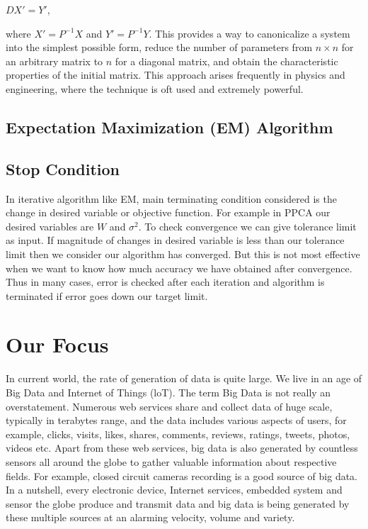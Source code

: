 \documentclass[12pt,notitlepage,oneside]{report}
\begin{document}
$DX' = Y'$,

where $X'=P^{-1}X$ and $Y'=P^{-1}Y$. This provides a way to canonicalize a system into the simplest possible form, reduce the number of parameters from $n \times n$ for an arbitrary matrix to $n$ for a diagonal matrix, and obtain the characteristic properties of the initial matrix. This approach arises frequently in physics and engineering, where the technique is oft used and extremely powerful.



\section{Expectation Maximization (EM) Algorithm}

\section{Stop Condition}

In iterative algorithm like EM, main terminating condition considered is the change in desired variable or objective function. For example in PPCA our desired variables are $W$ and $ \sigma ^2$. To check convergence we can give tolerance limit as input. If magnitude of changes in desired variable is less than our tolerance limit then we consider our algorithm has converged. But this is not most effective when we want to know how much accuracy we have obtained after convergence. Thus in many cases, error is checked after each iteration and algorithm is terminated if error goes down our target limit.









\chapter{Our Focus}
	\label{c:4}
In current world, the rate of generation of data is quite large. We live in an age of Big Data and Internet of Things (loT). The term Big Data is not really an overstatement. Numerous web services share and collect data of huge scale, typically in terabytes range, and the data includes various aspects of users, for example, clicks, visits, likes, shares, comments, reviews, ratings, tweets, photos, videos etc. Apart from these web services, big data is also generated by countless sensors all around the globe to gather valuable information about respective fields. For example, closed circuit cameras recording is a good source of big data. In a nutshell, every electronic device, Internet services, embedded system and sensor the globe produce and transmit data and big data is being generated by these multiple sources at an alarming velocity, volume and variety.
\end{document}

